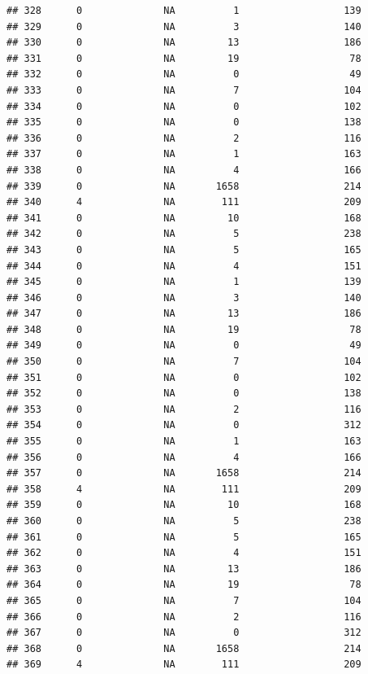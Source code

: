 \documentclass[
]{article}
\begin{document}
\begin{verbatim}
## 328      0              NA          1                  139
## 329      0              NA          3                  140
## 330      0              NA         13                  186
## 331      0              NA         19                   78
## 332      0              NA          0                   49
## 333      0              NA          7                  104
## 334      0              NA          0                  102
## 335      0              NA          0                  138
## 336      0              NA          2                  116
## 337      0              NA          1                  163
## 338      0              NA          4                  166
## 339      0              NA       1658                  214
## 340      4              NA        111                  209
## 341      0              NA         10                  168
## 342      0              NA          5                  238
## 343      0              NA          5                  165
## 344      0              NA          4                  151
## 345      0              NA          1                  139
## 346      0              NA          3                  140
## 347      0              NA         13                  186
## 348      0              NA         19                   78
## 349      0              NA          0                   49
## 350      0              NA          7                  104
## 351      0              NA          0                  102
## 352      0              NA          0                  138
## 353      0              NA          2                  116
## 354      0              NA          0                  312
## 355      0              NA          1                  163
## 356      0              NA          4                  166
## 357      0              NA       1658                  214
## 358      4              NA        111                  209
## 359      0              NA         10                  168
## 360      0              NA          5                  238
## 361      0              NA          5                  165
## 362      0              NA          4                  151
## 363      0              NA         13                  186
## 364      0              NA         19                   78
## 365      0              NA          7                  104
## 366      0              NA          2                  116
## 367      0              NA          0                  312
## 368      0              NA       1658                  214
## 369      4              NA        111                  209

\end{verbatim}
\end{document}
